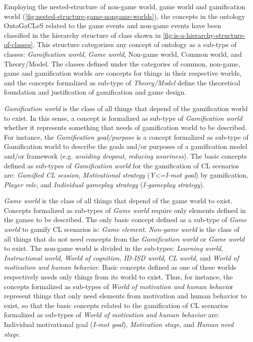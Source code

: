 Employing the nested-structure of non-game world, game world and gamification world (\autoref{fig:nested-structure-game-nongame-worlds}), the concepts in the ontology OntoGaCLeS related to the game events and non-game events have been classified in the  hierarchy structure of class shown in \autoref{fig:is-a-hierarchy-structure-of-classes}.
This structure categorizes any concept of ontology as a sub-type of classes: \emph{Gamification world}, \emph{Game world}, Non-game world, Common world, and Theory/Model.
The classes defined under the categories of common, non-game, game and gamification worlds are concepts for things in their respective worlds, and the concepts formalized as sub-type of \emph{Theory/Model} define the theoretical foundation and justification of gamification and game design.

\emph{Gamification world} is the class of all things that depend of the gamification world to exist. In this sense, a concept is formalized as sub-type of \emph{Gamification world} whether it represents something that needs of gamification world to be described.
For instance, the \emph{Gamification goal/purpose} is a concept formalized as sub-type of Gamification world to describe the goals and/or purposes of a gamification model and/or framework (e.g. \emph{avoiding dropout}, \emph{reducing weariness}).
The basic concepts defined as sub-types of \emph{Gamification world} for the gamification of CL scenarios are: \emph{Gamified CL session}, \emph{Motivational strategy}  (\emph{Y<=I-mot goal}) by gamification, \emph{Player role}, and \emph{Individual gameplay strategy} (\emph{I-gameplay strategy}).

\emph{Game world} is the class of all things that depend of the game world to exist.
Concepts formalized as sub-types of \emph{Game world} require only elements defined in the games to be described.
The only basic concept defined as a sub-type of \emph{Game world} to gamify CL scenarios is: \emph{Game element}.
\emph{Non-game world} is the class of all things that do not need concepts from the \emph{Gamification world} or \emph{Game world} to exist.
The non-game world is divided in the sub-types: \emph{Learning world}, \emph{Instructional world}, \emph{World of cognition}, \emph{ID-ISD world}, \emph{CL world}, and \emph{World of motivation and human behavior}.
Basic concepts defined as one of these worlds respectively needs only things from its world to exist.
Thus, for instance, the concepts formalized as sub-types of\emph{ World of motivation and human behavio}r represent things that only need elements from motivation and human behavior to exist, so that the basic concepts related to the gamification of CL scenarios formalized as sub-types of \emph{World of motivation and human behavior} are: Individual motivational goal (\emph{I-mot goal}), \emph{Motivation stage}, and \emph{Human need stage}.

